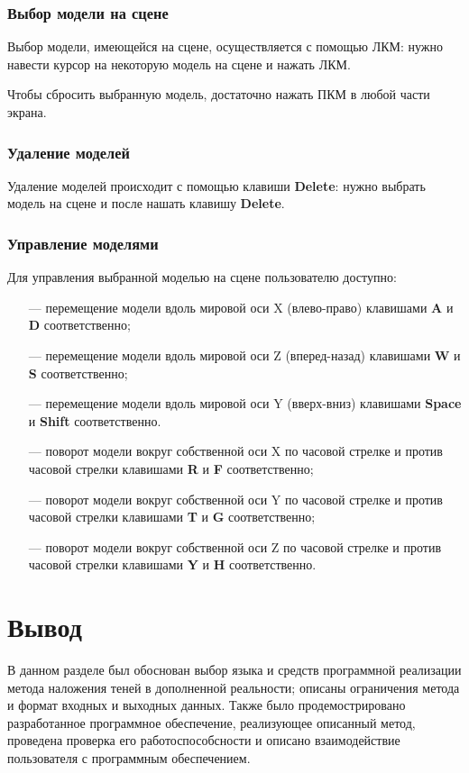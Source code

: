 \subsubsection*{Выбор модели на сцене}

Выбор модели, имеющейся на сцене, осуществляется с помощью ЛКМ: нужно навести курсор на некоторую модель на сцене и нажать ЛКМ. 

Чтобы сбросить выбранную модель, достаточно нажать ПКМ в любой части экрана.

\subsubsection*{Удаление моделей}

Удаление моделей происходит с помощью клавиши \textbf{Delete}: нужно выбрать модель на сцене и после нашать клавишу \textbf{Delete}.

\subsubsection*{Управление моделями}

Для управления выбранной моделью на сцене пользователю доступно:

\begin{itemize}
	\item[---] перемещение модели вдоль мировой оси X (влево-право) клавишами \textbf{A} и \textbf{D} соответственно;
	\item[---] перемещение модели вдоль мировой оси Z (вперед-назад) клавишами \textbf{W} и \textbf{S} соответственно;
	\item[---] перемещение модели вдоль мировой оси Y (вверх-вниз) клавишами \textbf{Space} и \textbf{Shift} соответственно.
	\item[---] поворот модели вокруг собственной оси X по часовой стрелке и против часовой стрелки клавишами \textbf{R} и \textbf{F} соответственно;
	\item[---] поворот модели вокруг собственной оси Y по часовой стрелке и против часовой стрелки клавишами \textbf{T} и \textbf{G} соответственно;
	\item[---] поворот модели вокруг собственной оси Z по часовой стрелке и против часовой стрелки клавишами \textbf{Y} и \textbf{H} соответственно.
\end{itemize}

\section*{Вывод}

В данном разделе был обоснован выбор языка и средств программной реализации метода наложения теней в дополненной реальности; описаны ограничения метода и формат входных и выходных данных. Также было продемострировано разработанное программное обеспечение, реализующее описанный метод, проведена проверка его работоспособсности и описано взаимодействие пользователя с программным обеспечением.